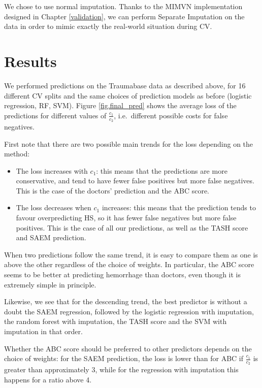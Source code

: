 We chose to use normal imputation. Thanks to the MIMVN implementation designed in Chapter \ref{validation}, we can perform Separate Imputation on the data in order to mimic exactly the real-world situation during CV.

	\section{Results}
We performed predictions on the Traumabase data as described above, for 16 different CV splits and the same choices of prediction models as before (logistic regression, RF, SVM). Figure \ref{fig.final_pred} shows the average loss of the predictions for different values of $\frac{c_1}{c_2}$, i.e.\ different possible costs for false negatives. 



First note that there are two possible main trends for the loss depending on the method:
\begin{itemize}
\item The loss increases with $c_1$: this means that the predictions are more conservative, and tend to have fewer false positives but more false negatives. This is the case of the doctors' prediction and the ABC score.
\item The loss decreases when $c_1$ increases: this means that the prediction tends to favour overpredicting HS, so it has fewer false negatives but more false positives. This is the case of all our predictions, as well as the TASH score and SAEM prediction.
\end{itemize}

When two predictions follow the same trend, it is easy to compare them as one is above the other regardless of the choice of weights. In particular, the ABC score seems to be better at predicting hemorrhage than doctors, even though it is extremely simple in principle.

Likewise, we see that for the descending trend, the best predictor is without a doubt the SAEM regression, followed by the logistic regression with imputation, the random forest with imputation, the TASH score and the SVM with imputation in that order.

Whether the ABC score should be preferred to other predictors depends on the choice of weights: for the SAEM prediction, the loss is lower than for ABC if $\frac{c_1}{c_2}$ is greater than approximately 3, while for the regression with imputation this happens for a ratio above 4.

